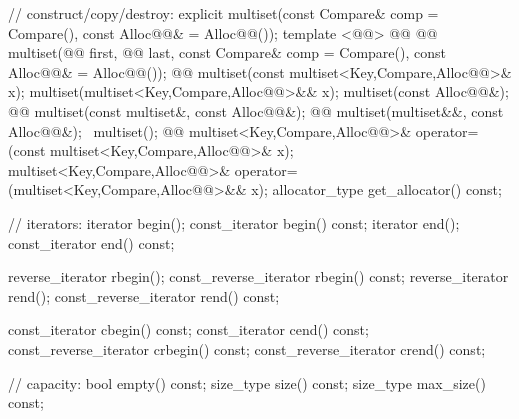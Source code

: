 \documentclass[american,twoside]{book}
\begin{document}
\begin{codeblock}
{{    // construct/copy/destroy:
    explicit multiset(const Compare& comp = Compare(),
                      const Alloc@@& = Alloc@@());
    template <@@>
      @@
            @@
      multiset(@@ first, @@ last,
               const Compare& comp = Compare(),
               const Alloc@@& = Alloc@@());
    @@ 
      multiset(const multiset<Key,Compare,Alloc@@>& x);
    multiset(multiset<Key,Compare,Alloc@@>&& x);
    multiset(const Alloc@@&);
    @@ 
      multiset(const multiset&, const Alloc@@&);
    @@
      multiset(multiset&&, const Alloc@@&);
   ~multiset();
    @@
      multiset<Key,Compare,Alloc@@>& operator=(const multiset<Key,Compare,Alloc@@>& x);
    multiset<Key,Compare,Alloc@@>& operator=(multiset<Key,Compare,Alloc@@>&& x);
    allocator_type get_allocator() const;

    // iterators:
    iterator               begin();
    const_iterator         begin() const;
    iterator               end();
    const_iterator         end() const;

    reverse_iterator       rbegin();
    const_reverse_iterator rbegin() const;
    reverse_iterator       rend();
    const_reverse_iterator rend() const;

    const_iterator         cbegin() const;
    const_iterator         cend() const;
    const_reverse_iterator crbegin() const;
    const_reverse_iterator crend() const;

    // capacity:
    bool          empty() const;
    size_type     size() const;
    size_type     max_size() const;

}}
\end{codeblock}
\end{document}
